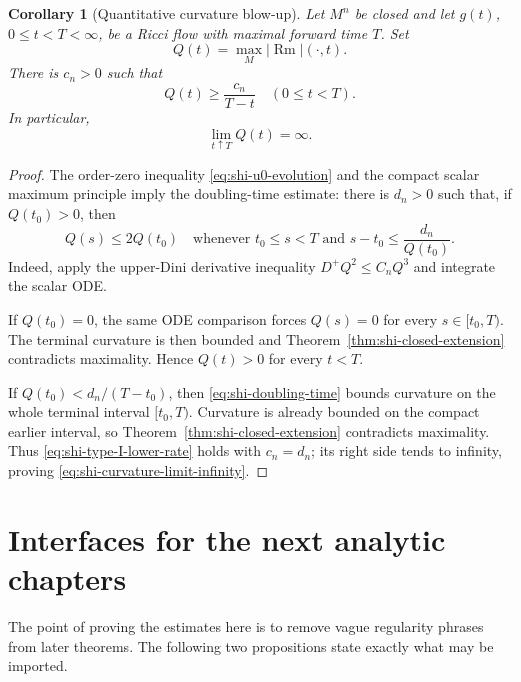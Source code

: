 \documentclass[10pt]{coll-l}
\newtheorem{corollary}[theorem]{Corollary}
\theoremstyle{definition}
\theoremstyle{remark}
\numberwithin{section}{chapter}
\numberwithin{equation}{chapter}
\newcommand{\Rm}{\operatorname{Rm}}
\begin{document}
\begin{corollary}[Quantitative curvature blow-up]
\label{cor:shi-quantitative-blowup}
Let $M^n$ be closed and let $g(t)$, $0\leq t<T<\infty$, be a Ricci flow with
maximal forward time $T$.  Set
\[
                       Q(t)=\max_M|\Rm|(\cdot,t).
\]
There is $c_n>0$ such that
\begin{equation}
             Q(t)\geq\frac{c_n}{T-t}
             \quad(0\leq t<T).                           \label{eq:shi-type-I-lower-rate}
\end{equation}
In particular,
\begin{equation}
                       \lim_{t\uparrow T}Q(t)=\infty.     \label{eq:shi-curvature-limit-infinity}
\end{equation}
\end{corollary}

\begin{proof}
The order-zero inequality \eqref{eq:shi-u0-evolution} and the compact scalar
maximum principle imply the doubling-time estimate: there is $d_n>0$ such
that, if $Q(t_0)>0$, then
\begin{equation}
        Q(s)\leq2Q(t_0)
        \quad\text{whenever }t_0\leq s<T
        \text{ and }s-t_0\leq\frac{d_n}{Q(t_0)}.          \label{eq:shi-doubling-time}
\end{equation}
Indeed, apply the upper-Dini derivative inequality
$D^+Q^2\leq C_nQ^3$ and integrate the scalar ODE.

If $Q(t_0)=0$, the same ODE comparison forces $Q(s)=0$ for every
$s\in[t_0,T)$.  The terminal curvature is then bounded and
Theorem~\ref{thm:shi-closed-extension} contradicts maximality.  Hence
$Q(t)>0$ for every $t<T$.

If $Q(t_0)<d_n/(T-t_0)$, then
\eqref{eq:shi-doubling-time} bounds curvature on the whole terminal interval
$[t_0,T)$.  Curvature is already bounded on the compact earlier interval,
so Theorem~\ref{thm:shi-closed-extension} contradicts maximality.  Thus
\eqref{eq:shi-type-I-lower-rate} holds with $c_n=d_n$; its right side tends
to infinity, proving \eqref{eq:shi-curvature-limit-infinity}.
\end{proof}

\section{Interfaces for the next analytic chapters}
\label{sec:shi-project-interfaces}

The point of proving the estimates here is to remove vague regularity
phrases from later theorems.  The following two propositions state exactly
what may be imported.
\end{document}
